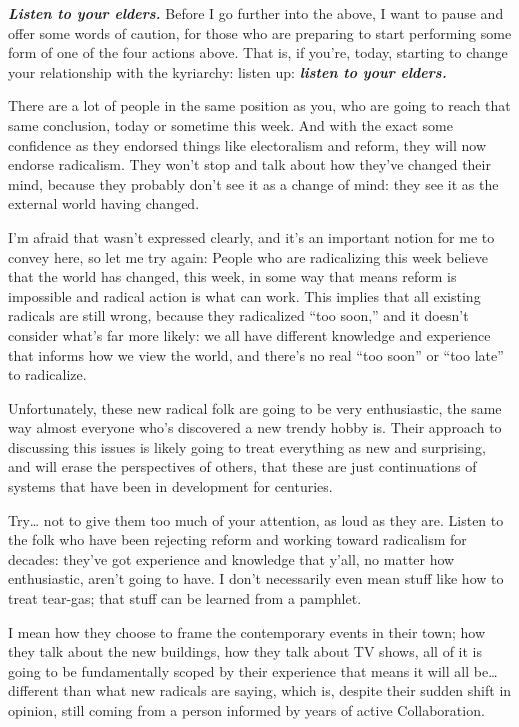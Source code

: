 \documentclass[11pt]{article}
\begin{document}
\begin{itemize}
\textbf{\emph{Listen to your elders.}} Before I go further into the above, I want to pause and offer some words of caution, for those who are preparing to start performing some form of one of the four actions above. That is, if you’re, today, starting to change your relationship with the kyriarchy: listen up: \textbf{\emph{listen to your elders.}}

There are a lot of people in the same position as you, who are going to reach that same conclusion, today or sometime this week. And with the exact some confidence as they endorsed things like electoralism and reform, they will now endorse radicalism. They won’t stop and talk about how they’ve changed their mind, because they probably don’t see it as a change of mind: they see it as the external world having changed.

I’m afraid that wasn’t expressed clearly, and it’s an important notion for me to convey here, so let me try again: People who are radicalizing this week believe that the world has changed, this week, in some way that means reform is impossible and radical action is what can work. This implies that all existing radicals are still wrong, because they radicalized “too soon,” and it doesn’t consider what’s far more likely: we all have different knowledge and experience that informs how we view the world, and there’s no real “too soon” or “too late” to radicalize.

Unfortunately, these new radical folk are going to be very enthusiastic, the same way almost everyone who’s discovered a new trendy hobby is. Their approach to discussing this issues is likely going to treat everything as new and surprising, and will erase the perspectives of others, that these are just continuations of systems that have been in development for centuries.

Try… not to give them too much of your attention, as loud as they are. Listen to the folk who have been rejecting reform and working toward radicalism for decades: they’ve got experience and knowledge that y’all, no matter how enthusiastic, aren’t going to have. I don’t necessarily even mean stuff like how to treat tear-gas; that stuff can be learned from a pamphlet.

I mean how they choose to frame the contemporary events in their town; how they talk about the new buildings, how they talk about TV shows, all of it is going to be fundamentally scoped by their experience that means it will all be… different than what new radicals are saying, which is, despite their sudden shift in opinion, still coming from a person informed by years of active Collaboration.


\end{itemize}
\end{document}
